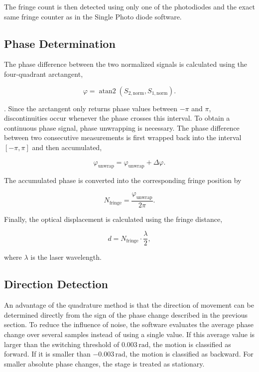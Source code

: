 The fringe count is then detected using only one of the photodiodes and the exact same fringe counter as in the Single Photo diode software.

\subsection{Phase Determination}

The phase difference between the two normalized signals is calculated using the four-quadrant arctangent,

\begin{equation}
\varphi=\operatorname{atan2}
\left(
S_{2,\mathrm{norm}},
S_{1,\mathrm{norm}}
\right).
\end{equation}

. Since the arctangent only returns phase values between \(-\pi\) and \(\pi\), discontinuities occur whenever the phase crosses this interval. To obtain a continuous phase signal, phase unwrapping is necessary. The phase difference between two consecutive measurements is first wrapped back into the interval \([-\pi,\pi]\) and then accumulated,

\begin{equation}
\varphi_{\mathrm{unwrap}}
=
\varphi_{\mathrm{unwrap}}
+
\Delta\varphi.
\end{equation}

The accumulated phase is converted into the corresponding fringe position by

\begin{equation}
N_{\mathrm{fringe}}
=
\frac{\varphi_{\mathrm{unwrap}}}{2\pi}.
\end{equation}

Finally, the optical displacement is calculated using the fringe distance,

\begin{equation}
d
=
N_{\mathrm{fringe}}
\cdot
\frac{\lambda}{2},
\end{equation}

where \(\lambda\) is the laser wavelength.

\subsection{Direction Detection}


An advantage of the quadrature method is that the direction of movement can be determined directly from the sign of the phase change described in the previous section. To reduce the influence of noise, the software evaluates the average phase change over several samples instead of using a single value. If this average value is larger than the switching threshold of \(0.003\,\mathrm{rad}\), the motion is classified as forward. If it is smaller than \(-0.003\,\mathrm{rad}\), the motion is classified as backward. For smaller absolute phase changes, the stage is treated as stationary.

